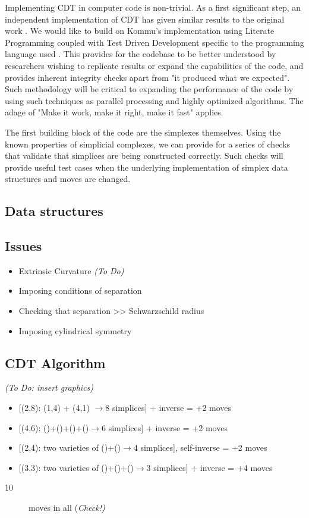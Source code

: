 \documentclass{article}
\begin{document}
Implementing CDT in computer code is non-trivial. As a first significant step, an independent implementation of CDT has given similar results to the original work \cite{kommu2011}. We would like to build on Kommu's implementation using Literate Programming \cite{knuth_literate_1984} coupled with Test Driven Development specific to the programming language used \cite{rathore_clojure_2011}. This provides for the codebase to be better understood by researchers wishing to replicate results or expand the capabilities of the code, and provides inherent integrity checks apart from "it produced what we expected". Such methodology will be critical to expanding the performance of the code by using such techniques as parallel processing and highly optimized algorithms. The adage of "Make it work, make it right, make it fast" applies.

The first building block of the code are the simplexes themselves. Using the known properties of simplicial complexes, we can provide for a series of checks that validate that simplices are being constructed correctly. Such checks will provide useful test cases when the underlying implementation of simplex data structures and moves are changed.

\subsection{Data structures}

\subsection{Issues}

\begin{itemize}
\item Extrinsic Curvature \emph{(To Do)}
\item Imposing conditions of separation
\item Checking that separation >\textcompwordmark{}> Schwarzschild radius
\item Imposing cylindrical symmetry
\end{itemize}

\subsection{CDT Algorithm}

\emph{(To Do: insert graphics)}

\begin{itemize}
\item {[}(2,8): (1,4) + (4,1) $\rightarrow$8 simplices{]} + inverse = +2
moves
\item {[}(4,6): ()+()+()+()$\rightarrow$6 simplices{]} + inverse = +2 moves
\item {[}(2,4): two varieties of ()+()$\rightarrow$4 simplices{]}, self-inverse
= +2 moves
\item {[}(3,3): two varieties of ()+()+()$\rightarrow$3 simplices{]} +
inverse = +4 moves\end{itemize}
\begin{description}
\item [{10}] moves in all (\emph{Check!)}
\end{description}
\end{document}
